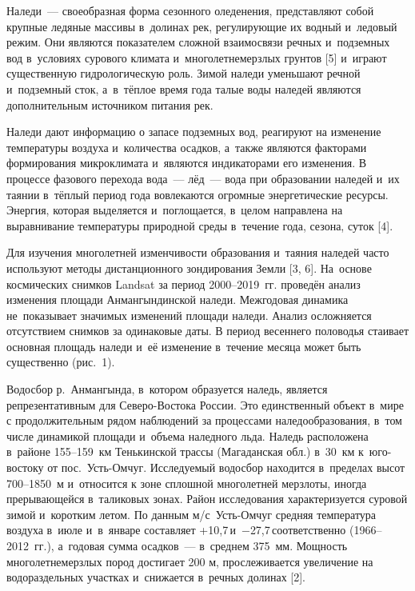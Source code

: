  

\makeProcTitle
{}

Наледи~--- своеобразная форма сезонного оледенения, представляют собой крупные ледяные массивы в~долинах рек, регулирующие их водный и~ледовый режим.  Они являются показателем сложной взаимосвязи речных и~подземных вод в~условиях сурового климата и~многолетнемерзлых грунтов [5] и~играют существенную гидрологическую роль. Зимой наледи уменьшают речной и~подземный сток, а~в~тёплое время года талые воды наледей являются дополнительным источником питания рек.

Наледи дают информацию о запасе подземных вод, реагируют на изменение температуры воздуха и~количества осадков, а~также являются факторами формирования микроклимата и~являются индикаторами его изменения. В процессе фазового перехода вода~--- лёд~--- вода при образовании наледей и~их таянии в~тёплый период года вовлекаются огромные энергетические ресурсы. Энергия, которая выделяется и~поглощается, в~целом направлена на выравнивание температуры природной среды в~течение года, сезона, суток [4].

Для изучения многолетней изменчивости образования и~таяния наледей часто используют методы дистанционного зондирования Земли [3, 6]. На~основе космических снимков Landsat за период 2000--2019~гг. проведён анализ изменения площади Анмангындинской наледи. Межгодовая динамика не~показывает значимых изменений площади наледи. Анализ осложняется отсутствием снимков за одинаковые даты. В период весеннего половодья стаивает основная площадь наледи и~её изменение в~течение месяца может быть существенно (рис.~1).



Водосбор р.~Анмангында, в~котором образуется наледь, является репрезентативным для Северо-Востока России. Это единственный объект в~мире с продолжительным рядом наблюдений за процессами наледообразования, в~том числе динамикой площади и~объема наледного льда. Наледь расположена в~районе 155--159~км Тенькинской трассы (Магаданская обл.) в~30~км к~юго-востоку от пос.~Усть-Омчуг. Исследуемый водосбор находится в~пределах высот 700--1850~м и~относится к зоне сплошной многолетней мерзлоты, иногда прерывающейся в~таликовых зонах. Район исследования характеризуется суровой зимой и~коротким летом. По данным м/с~Усть-Омчуг средняя температура воздуха в~июле и~в~январе составляет +10,7\, и~$-$27,7\, соответственно (1966--2012~гг.), а~годовая сумма осадков~--- в~среднем 375~мм. Мощность многолетнемерзлых пород достигает 200 м, прослеживается увеличение на водораздельных участках и~снижается в~речных долинах [2].


